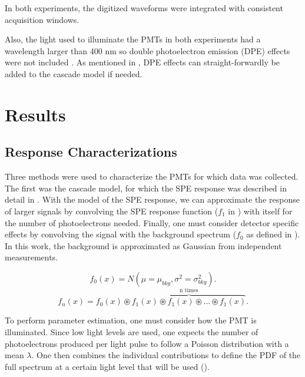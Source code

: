 In both experiments, the digitized waveforms were integrated with consistent acquisition windows.

Also, the light used to illuminate the PMTs in both experiments had a wavelength larger than 400 nm so double photoelectron emission (DPE) effects were not included \cite{faham2015measurements}.  As mentioned in , DPE effects can straight-forwardly be added to the cascade model if needed.


\section{Results}

\subsection{Response Characterizations}

Three methods were used to characterize the PMTs for which data was collected.  The first was the cascade model, for which the SPE response was described in detail in .  With the model of the SPE response, we can approximate the response of larger signals by convolving the SPE response function ($f_1$ in ) with itself for the number of photoelectrons needed.  Finally, one must consider detector specific effects by convolving the signal with the background spectrum ($f_0$ as defined in ).  In this work, the background is approximated as Gaussian from independent measurements.

\begin{equation}
        \label{bkg_spec}
        f_0(x) = N(\mu=\mu_{bkg}, \sigma^2=\sigma^2_{bkg}).
\end{equation}
\begin{equation}
        \label{spe_convolution}
        f_n(x) = f_0(x) \circledast \overbrace{f_1(x) \circledast f_1(x) \circledast \ldots \circledast f_1(x)}^{\text{n times}}.
\end{equation}

To perform parameter estimation, one must consider how the PMT is illuminated.  Since low light levels are used, one expects the number of photoelectrons produced per light pulse to follow a Poisson distribution with a mean $\lambda$.  One then combines the individual contributions to define the PDF of the full spectrum at a certain light level that will be used ().

